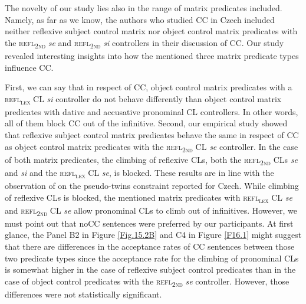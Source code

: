 The novelty of our study lies also in the range of matrix predicates included. Namely, as far as we know, the authors who studied CC in Czech included neither reflexive subject control matrix nor object control matrix predicates with the \textsc{refl\textsubscript{2nd}} \textit{se} and \textsc{refl\textsubscript{2nd}} \textit{si} controllers in their discussion of CC. Our study revealed interesting insights into how the mentioned three matrix predicate types influence CC. 

First, we can say that in respect of CC, object control matrix predicates with a \textsc{refl\textsubscript{\textsc{lex}}} CL \textit{si} controller do not behave differently than object control matrix predicates with dative and accusative pronominal CL controllers. In other words, all of them block CC out of the infinitive. Second, our empirical study showed that reflexive subject control matrix predicates behave the same in respect of CC as object control matrix predicates with the \textsc{refl\textsubscript{2nd}} CL \textit{se} controller. In the case of both matrix predicates, the climbing of reflexive CLs, both the \textsc{refl\textsubscript{2nd}} CLs \textit{se} and \textit{si} and the \textsc{refl\textsubscript{\textsc{lex}}} CL \textit{se}, is blocked. These results are in line with the observation of \citet[][]{Junghanns02} on the pseudo-twins constraint reported for Czech. While climbing of reflexive CLs is blocked, the mentioned matrix predicates with \textsc{refl\textsubscript{\textsc{lex}}} CL \textit{se} and \textsc{refl\textsubscript{2nd}} CL \textit{se} allow pronominal CLs to climb out of infinitives. However, we must point out that noCC sentences were preferred by our participants. At first glance, the Panel B2 in Figure \ref{Fig.15.2B} and C4 in Figure \ref{F16.1} might suggest that there are differences in the acceptance rates of CC sentences between those two predicate types since the acceptance rate for the climbing of pronominal CLs is somewhat higher in the case of reflexive subject control predicates than in the case of object control predicates with the \textsc{refl\textsubscript{2nd}} \textit{se} controller. However, those differences were not statistically significant. 
